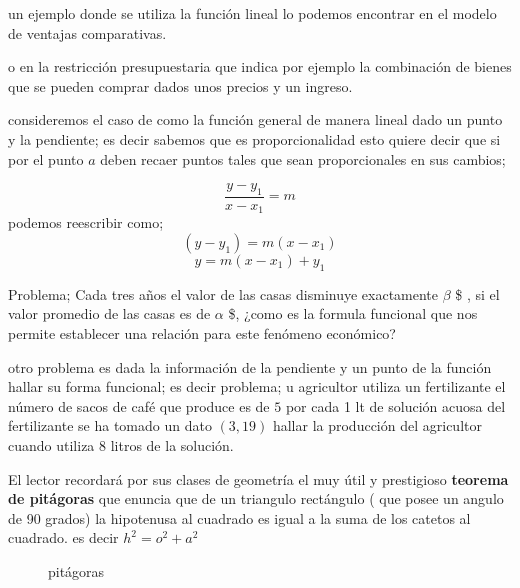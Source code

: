 \documentclass[12pt]{article}
\begin{document}
\newpage







un ejemplo donde se utiliza la función lineal lo podemos encontrar en el modelo de ventajas comparativas.

o en la restricción presupuestaria que indica por ejemplo la combinación de bienes que se pueden comprar dados unos precios y un ingreso.



consideremos el caso de como la función general de manera lineal dado un punto y la pendiente; es decir sabemos que es proporcionalidad esto quiere decir que si por el punto $a$ deben recaer puntos tales que sean proporcionales en sus cambios; 

$$\dfrac{y-y_{1}}{x-x_{1}}= m$$ podemos reescribir como; 
$$(y-y_{1})=m(x-x_{1})$$
$$y=m(x-x_{1})+ y_{1}$$




Problema; Cada tres años el valor de las casas disminuye exactamente $\beta$ \$ , si el valor promedio de las casas es de $\alpha$ \$, ¿como es la formula funcional que nos permite establecer una relación para este fenómeno económico?

otro problema es dada la información de la pendiente y  un punto de la función hallar su forma funcional; es decir problema; u agricultor utiliza un fertilizante el número de sacos de café que produce es de $5 $ por cada 1 lt de solución acuosa del fertilizante se ha tomado un dato $(3,19)$ hallar la producción del agricultor cuando utiliza 8 litros de la solución. 




El lector recordará por sus clases de geometría el muy útil y prestigioso \textbf{teorema de pitágoras} que enuncia que de un triangulo rectángulo ( que posee un angulo de 90 grados)  la hipotenusa al cuadrado es igual a la suma de los catetos al cuadrado. es decir $h^{2}= o^{2}+a^{2}$


\begin{figure}

\begin{center}

\caption{pitágoras}


\end{center}

\end{figure}
\end{document}

